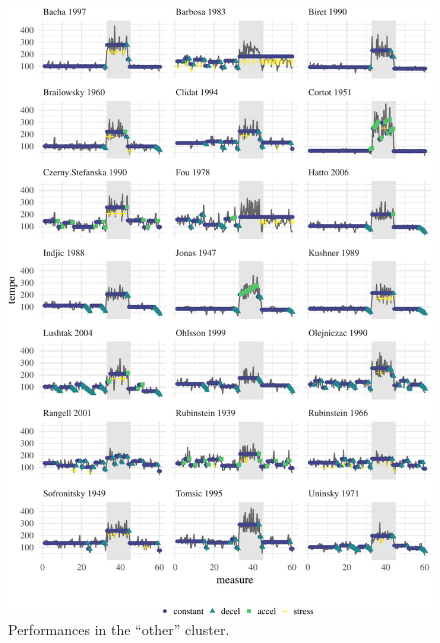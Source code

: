 \documentclass[12pt]{article}
\begin{document}
\begin{figure}

{\centering \includegraphics{gfx/clust-other-1} 

}

\caption{Performances in the ``other'' cluster.}\label{fig:clust-other}
\end{figure}



\end{document}

